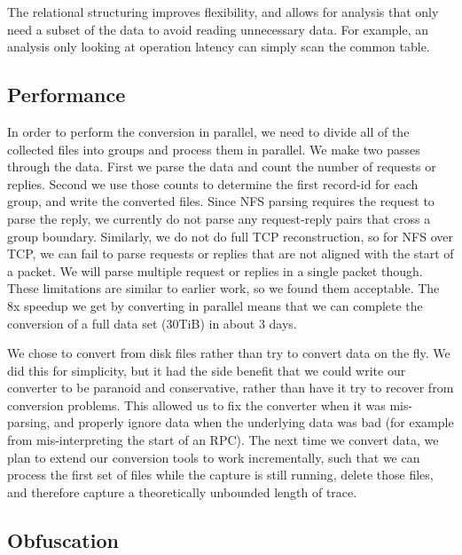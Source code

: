 The relational structuring improves flexibility, and allows for
analysis that only need a subset of the data to avoid reading
unnecessary data.  For example, an analysis only looking at operation
latency can simply scan the common table.

\subsection{Performance}

In order to perform the conversion in parallel, we need to divide all
of the collected files into groups and process them in parallel.  We
make two passes through the data.  First we parse the data and count
the number of requests or replies.  Second we use those counts to
determine the first record-id for each group, and write the converted files.
Since NFS parsing requires the request to parse the
reply, we currently do not parse any request-reply pairs that cross a
group boundary.  Similarly, we do not do full TCP reconstruction, so
for NFS over TCP, we can fail to parse requests or replies that are
not aligned with the start of a packet.  We will parse multiple
request or replies in a single packet though.  These limitations are similar
to earlier work, so we found them acceptable.  The 8x speedup we get
by converting in parallel means that we can complete the conversion of
a full data set (30TiB) in about 3 days.

We chose to convert from disk files rather than try to convert data on
the fly.  We did this for simplicity, but it had the side benefit that
we could write our converter to be paranoid and conservative, rather
than have it try to recover from conversion problems.  This allowed us
to fix the converter when it was mis-parsing, and properly ignore data
when the underlying data was bad (for example from mis-interpreting
the start of an RPC).  The next time we convert data, we plan to
extend our conversion tools to work incrementally, such that we can
process the first set of files while the capture is still running,
delete those files, and therefore capture a theoretically unbounded
length of trace.


\subsection{Obfuscation}

